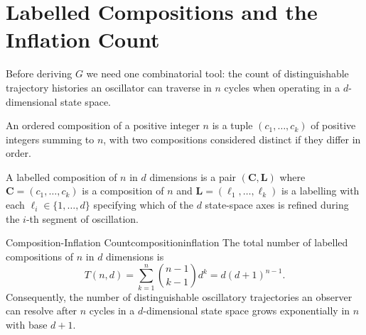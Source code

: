 \section{Labelled Compositions and the Inflation Count}
\label{sec:ch19-compositioninflation}

Before deriving $G$ we need one combinatorial tool: the count of
distinguishable trajectory histories an oscillator can traverse in $n$ cycles
when operating in a $d$-dimensional state space.

\begin{definition}
An ordered composition of a positive integer $n$ is a tuple
$(c_{1},\ldots,c_{k})$ of positive integers summing to $n$, with two
compositions considered distinct if they differ in order.
\end{definition}

\begin{definition}
A labelled composition of $n$ in $d$ dimensions is a pair $(\mathbf{C},\mathbf{L})$
where $\mathbf{C} = (c_{1},\ldots,c_{k})$ is a composition of $n$ and
$\mathbf{L} = (\ell_{1},\ldots,\ell_{k})$ is a labelling with each
$\ell_{i} \in \{1,\ldots,d\}$ specifying which of the $d$ state-space axes
is refined during the $i$-th segment of oscillation.
\end{definition}

\begin{consequence}{Composition-Inflation Count}{compositioninflation}
  The total number of labelled compositions of $n$ in $d$ dimensions is
  \begin{equation}\label{eq:compositioninflation}
    T(n,d) = \sum_{k=1}^{n}\binom{n-1}{k-1}d^{k} = d(d+1)^{n-1}.
  \end{equation}
  Consequently, the number of distinguishable oscillatory trajectories an
  observer can resolve after $n$ cycles in a $d$-dimensional state space grows
  exponentially in $n$ with base $d+1$.
\end{consequence}

